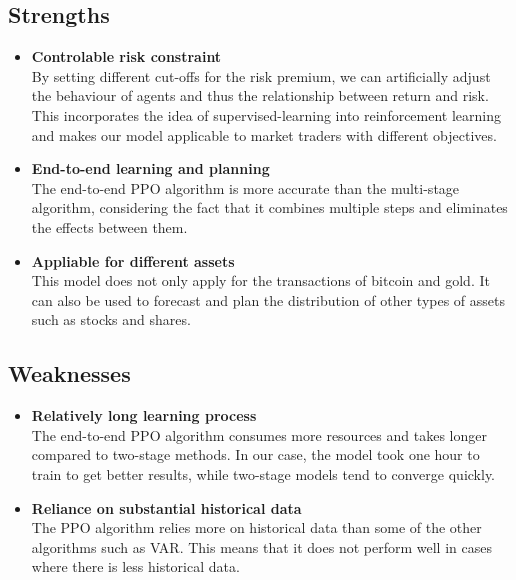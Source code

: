 \documentclass{mcmthesis}
\begin{document}
\subsection{Strengths}
\begin{itemize}
\item \textbf{Controlable risk constraint}\\
By setting different cut-offs for the risk premium, we can artificially adjust the behaviour of agents and thus the relationship between return and risk. This incorporates the idea of supervised-learning into reinforcement learning and makes our model applicable to market traders with different objectives.
\item \textbf{End-to-end learning and planning}\\
The end-to-end PPO algorithm is more accurate than the multi-stage algorithm, considering the fact that it combines multiple steps and eliminates the effects between them.
\item \textbf{Appliable for different assets}\\
This model does not only apply for the transactions of bitcoin and gold.
It can also be used to forecast and plan the distribution of other types of assets such as stocks and shares.
\end{itemize}

\subsection{Weaknesses}
\begin{itemize}
  \item \textbf{Relatively long learning process}\\
  The end-to-end PPO algorithm consumes more resources and takes longer compared to two-stage methods.
  In our case, the model took one hour to train to get better results, while two-stage models tend to converge quickly.
  \item \textbf{Reliance on substantial historical data}\\
  The PPO algorithm relies more on historical data than some of the other algorithms such as VAR. This means that it does not perform well in cases where there is less historical data.
\end{itemize}

\end{document}

